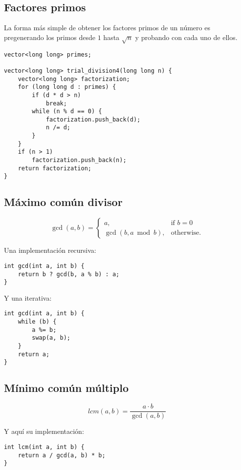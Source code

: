 \documentclass[10pt]{article}
\begin{document}
\subsection{Factores primos}

La forma más simple de obtener los factores primos de un número es pregenerando los primos desde $1$ hasta $\sqrt{n}$ y probando con cada uno de ellos.

\begin{lstlisting}
vector<long long> primes;

vector<long long> trial_division4(long long n) {
    vector<long long> factorization;
    for (long long d : primes) {
        if (d * d > n)
            break;
        while (n % d == 0) {
            factorization.push_back(d);
            n /= d;
        }
    }
    if (n > 1)
        factorization.push_back(n);
    return factorization;
}
\end{lstlisting}

\subsection{Máximo común divisor}

\[ \gcd(a, b) = \begin{cases}a,&\text{if }b = 0 \\ \gcd(b, a \bmod b),&\text{otherwise.}\end{cases} \]

Una implementación recursiva:

\begin{lstlisting}
int gcd(int a, int b) {
    return b ? gcd(b, a % b) : a;
}
\end{lstlisting}

Y una iterativa:

\begin{lstlisting}
int gcd(int a, int b) {
    while (b) {
        a %= b;
        swap(a, b);
    }
    return a;
}
\end{lstlisting}

\subsection{Mínimo común múltiplo}

\[ lcm(a, b) = \frac{a \cdot b}{\gcd(a, b)} \]

Y aquí su implementación:

\begin{lstlisting}
int lcm(int a, int b) {
    return a / gcd(a, b) * b;
}
\end{lstlisting}
\end{document}
